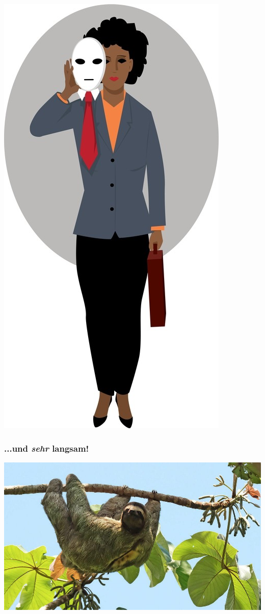 \documentclass[aspectratio=43,x11names]{beamer}
\begin{document}
\begin{frame}
\begin{minipage}{0.45\textwidth}
\begin{center}
\includegraphics[keepaspectratio, height=0.7\textheight]{images/human_bias}
\end{center}
\end{minipage}
\end{frame}

\begin{frame}
\frametitle{...und \emph{sehr} langsam!}
\begin{center}
\includegraphics[height=0.65\textheight, keepaspectratio]{images/sloth}
\end{center}
\end{frame}
\end{document}
